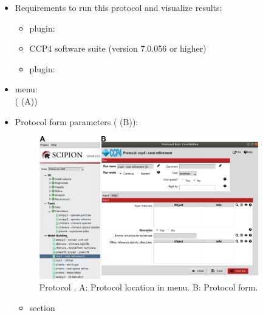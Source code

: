 \begin{itemize}
  \item Requirements to run this protocol and visualize results:
    \begin{itemize}
        \item \scipion plugin: 
        \item CCP4 software suite (version 7.0.056 or higher)
        \item \scipion plugin: 
    \end{itemize}
  \item \scipion menu:\\
    ( (A))
  
  \item Protocol form parameters ( (B)):
  
    \begin{figure}[H]
     \centering 
     \captionsetup{width=.7\linewidth} 
     \includegraphics[width=0.90\textwidth]{Images_appendix/Fig119.pdf}
     \caption{Protocol . A: Protocol location in \scipion menu. B: Protocol form.}
     \label{fig:app_protocol_coot_1}
    \end{figure}
    
    \begin{itemize}
     \item {} section


\end{itemize}
\end{itemize}
